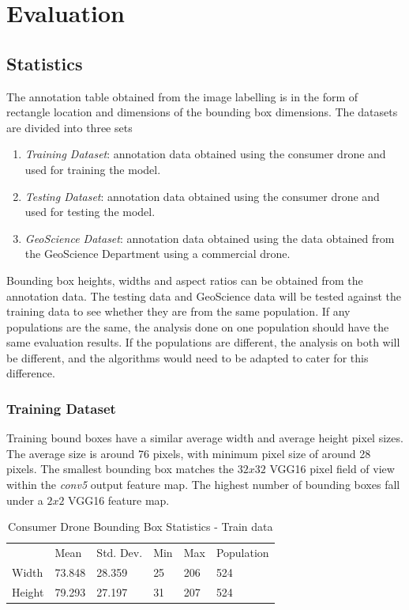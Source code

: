 \documentclass{article}
\begin{document}
\section{Evaluation}

\subsection{Statistics}

The annotation table obtained from the image labelling is in the form of rectangle location and dimensions of the bounding box dimensions. The datasets are divided into three sets
\begin{enumerate}
\item \textit{Training Dataset}: annotation data obtained using the consumer drone and used for training the model.
\item \textit{Testing Dataset}: annotation data obtained using the consumer drone and used for testing the model.
\item \textit{GeoScience Dataset}: annotation data obtained using the data obtained from the GeoScience Department using a commercial drone.
\end{enumerate}

Bounding box heights, widths and aspect ratios can be obtained from the annotation data. The testing data and GeoScience data will be tested against the training data to see whether they are from the same population. If any populations are the same, the analysis done on one population should have the same evaluation results. If the populations are different, the analysis on both will be different, and the algorithms would need to be adapted to cater for this difference.

\subsubsection{Training Dataset}

Training bound boxes have a similar average width and average height pixel sizes. The average size is around 76 pixels, with minimum pixel size of around 28 pixels. The smallest bounding box matches the $32x32$ VGG16 pixel field of view within the \textit{conv5} output feature map. The highest number of bounding boxes fall under a $2x2$ VGG16 feature map.

\begin{table}[ht]
\caption{Consumer Drone Bounding Box Statistics - Train data}
\centering
\begin{tabular}{llllll}
       & Mean   & Std. Dev. & Min & Max & Population \\
Width  & 73.848 & 28.359 & 25 & 206  & 524 \\
Height & 79.293 & 27.197 & 31 & 207  & 524
\end{tabular}
\end{table}
\end{document}
